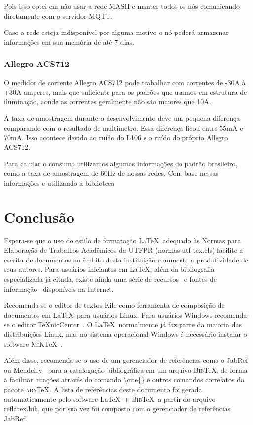 \documentclass[openright]{normas-utf-tex} %
\begin{document}
Pois isso optei em não usar a rede MASH e manter todos os nós comunicando diretamente com o servidor MQTT.

Caso a rede esteja indisponível por alguma motivo o nó poderá armazenar informações em sua memória de até 7 dias.

\subsection{Allegro ACS712}
O medidor de corrente Allegro ACS712 pode trabalhar com correntes de -30A à +30A amperes, mais que suficiente para os padrões que usamos em estrutura de iluminação, aonde as correntes geralmente não são maiores que 10A.

A taxa de amostragem durante o desenvolvimento deve um pequena diferença comparando com o resultado de multimetro. Essa diferença ficou entre 55mA e 70mA. Isso acontece devido ao ruído do L106 e o ruído do próprio Allegro ACS712.

Para calular o consumo utilizamos algumas informações do padrão brasileiro, como a taxa de amostragem de 60Hz de nossas redes. Com base nessas informações e utilizando a biblioteca 

\chapter{Conclusão}

Espera-se que o uso do estilo de formata\c{c}\~ao \LaTeX\ adequado \`as Normas para Elabora\c{c}\~ao de Trabalhos Acad\^emicos da UTFPR ({\ttfamily normas-utf-tex.cls}) facilite a escrita de documentos no \^ambito desta institui\c{c}\~ao e aumente a produtividade de seus autores. Para usu\'arios iniciantes em \LaTeX, al\'em da bibliografia especializada j\'a citada, existe ainda uma s\'erie de recursos~\cite{CTAN2009} e fontes de informa\c{c}\~ao~\cite{TeX-Br2009,Wikibooks2009} dispon\'iveis na Internet.

Recomenda-se o editor de textos Kile como ferramenta de composi\c{c}\~ao de documentos em \LaTeX\ para usu\'arios Linux. Para usu\'arios Windows recomenda-se o editor \TeX nicCenter~\cite{TeXnicCenter2009}. O \LaTeX\ normalmente j\'a faz parte da maioria das distribui\c{c}\~oes Linux, mas no sistema operacional Windows \'e necess\'ario instalar o software \textsc{MiK}\TeX~\cite{MiKTeX2009}.

Al\'em disso, recomenda-se o uso de um gerenciador de refer\^encias como o JabRef~\cite{JabRef2009} ou Mendeley~\cite{Mendeley2009} para a cataloga\c{c}\~ao bibliogr\'afica em um arquivo \textsc{Bib}\TeX, de forma a facilitar cita\c{c}\~oes atrav\'es do comando {\ttfamily \textbackslash cite\{\}} e outros comandos correlatos do pacote \textsc{abn}\TeX. A lista de refer\^encias deste documento foi gerada automaticamente pelo software \LaTeX\ + \textsc{Bib}\TeX\ a partir do arquivo {\ttfamily reflatex.bib}, que por sua vez foi composto com o gerenciador de refer\^encias JabRef.
\end{document}
